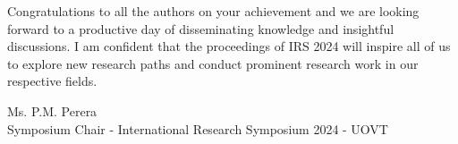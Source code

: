 Congratulations to all the authors on your achievement and we are looking forward to a productive day of disseminating knowledge and insightful discussions. I am confident that the proceedings of  IRS 2024 will inspire all of us to explore new research paths and conduct prominent research work in our respective fields.







    
Ms. P.M. Perera \\
Symposium Chair - International Research Symposium 2024 - UOVT


	\newpage
	